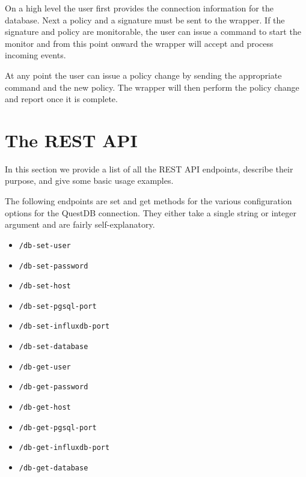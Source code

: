 On a high level the user first provides the connection information for the database.
Next a policy and a signature must be sent to the wrapper.
If the signature and policy are monitorable, the user can issue a command to start the monitor and from this point onward the wrapper will accept and process incoming events.

At any point the user can issue a policy change by sending the appropriate command and the new policy.
The wrapper will then perform the policy change and report once it is complete.

\section{The REST API}

In this section we provide a list of all the REST API endpoints, describe their purpose, and give some basic usage examples.



The following endpoints are set and get methods for the various configuration options for the QuestDB connection.
They either take a single string or integer argument and are fairly self-explanatory.
\begin{itemize}
    \item \texttt{/db-set-user}
    \item \texttt{/db-set-password}
    \item \texttt{/db-set-host}
    \item \texttt{/db-set-pgsql-port}
    \item \texttt{/db-set-influxdb-port}
    \item \texttt{/db-set-database}
    \item \texttt{/db-get-user}
    \item \texttt{/db-get-password}
    \item \texttt{/db-get-host}
    \item \texttt{/db-get-pgsql-port}
    \item \texttt{/db-get-influxdb-port}
    \item \texttt{/db-get-database}
\end{itemize}






